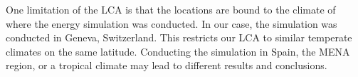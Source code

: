 One limitation of the LCA is that the locations are bound to the climate of where the energy simulation was conducted. In our case, the simulation was conducted in Geneva, Switzerland. This restricts our LCA to similar temperate climates on the same latitude. Conducting the simulation in Spain, the MENA region, or a tropical climate may lead to different results and conclusions.






